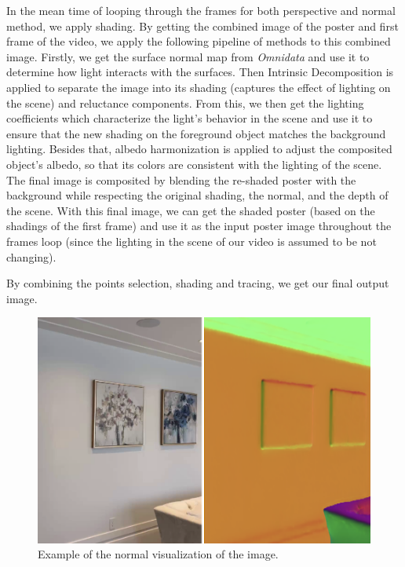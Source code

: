 \documentclass[sigconf]{acmart}
\newcommand{\putfigure}[1]{}
\begin{document}
In the mean time of looping through the frames for both perspective and normal method, we apply shading. By getting the combined image of the poster and first frame of the video, we apply the following pipeline of methods to this combined image. Firstly, we get the surface normal map from \textit{Omnidata} and use it to determine how light interacts with the surfaces. Then Intrinsic Decomposition is applied to separate the image into its shading (captures the effect of lighting on the scene) and reluctance components. From this, we then get the lighting coefficients which characterize the light's behavior in the scene and use it to ensure that the new shading on the foreground object matches the background lighting. Besides that, albedo harmonization is applied to adjust the composited object's albedo, so that its colors are consistent with the lighting of the scene. The final image is composited by blending the re-shaded poster with the background while respecting the original shading, the normal, and the depth of the scene. With this final image, we can get the shaded poster (based on the shadings of the first frame) and use it as the input poster image throughout the frames loop (since the lighting in the scene of our video is assumed to be not changing).

By combining the points selection, shading and tracing, we get our final output image.


\begin{figure}
  \centering
  \includegraphics[width=\linewidth]{fig/figure3.png}
  \caption{Example of the normal visualization of the image.}
  \label{fig:texture}
  \vspace{-0.5cm}
\end{figure}
\end{document}
